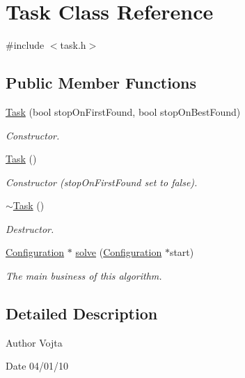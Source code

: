 \hypertarget{class_task}{
\section{Task Class Reference}
\label{class_task}
}


{\ttfamily \#include $<$task.h$>$}

\subsection*{Public Member Functions}
\begin{DoxyCompactItemize}
\item 
\hyperlink{class_task_a3b2058bcb0e107d00c57a3d6accb2189}{Task} (bool stopOnFirstFound, bool stopOnBestFound)
\begin{DoxyCompactList}\small\item\em Constructor. \item\end{DoxyCompactList}\item 
\hyperlink{class_task_a0ca53354bdc006762a0fda68c64f7608}{Task} ()
\begin{DoxyCompactList}\small\item\em Constructor (stopOnFirstFound set to false). \item\end{DoxyCompactList}\item 
\hyperlink{class_task_a3ecf499ea35fb4a96853969a1e1cbbce}{$\sim$Task} ()
\begin{DoxyCompactList}\small\item\em Destructor. \item\end{DoxyCompactList}\item 
\hyperlink{class_configuration}{Configuration} $\ast$ \hyperlink{class_task_a2c184c1af80eb089bb45c6ed83d14fff}{solve} (\hyperlink{class_configuration}{Configuration} $\ast$start)
\begin{DoxyCompactList}\small\item\em The main business of this algorithm. \item\end{DoxyCompactList}\end{DoxyCompactItemize}


\subsection{Detailed Description}
\begin{DoxyAuthor}{Author}
Vojta 
\end{DoxyAuthor}
\begin{DoxyDate}{Date}
04/01/10 
\end{DoxyDate}


